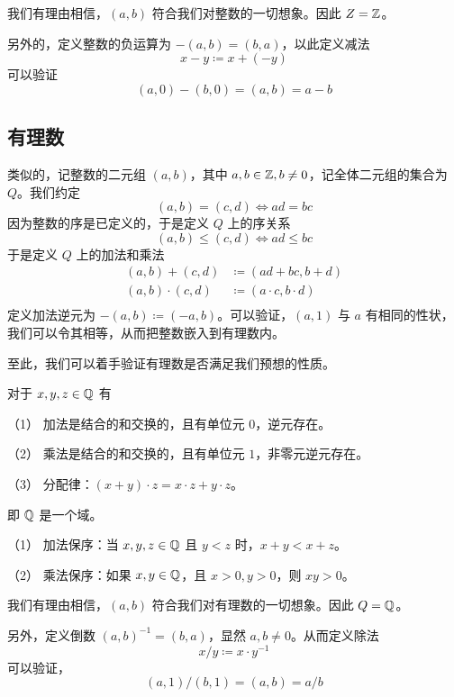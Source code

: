 我们有理由相信，$(a,b)$ 符合我们对整数的一切想象。因此 $Z = \mathbb{Z}$。

另外的，定义整数的负运算为 $-(a,b) = (b,a)$，以此定义减法
$$x - y \coloneqq  x + (-y)$$
可以验证
$$(a,0) - (b,0) = (a,b) = a - b$$

\subsection{有理数}

类似的，记整数的二元组 $(a,b)$，其中 $a,b\in \mathbb{Z},b\ne 0$，记全体二元组的集合为 $Q$。我们约定
$$(a,b) = (c,d) \Leftrightarrow ad = bc$$
因为整数的序是已定义的，于是定义 $Q$ 上的序关系
$$(a,b) \leqslant (c,d) \Leftrightarrow ad \leqslant bc$$
于是定义 $Q$ 上的加法和乘法
\begin{equation*}
	\begin{aligned}
		(a,b) + (c,d)     & \coloneqq  (ad+bc,b+d)           \\
		(a,b) \cdot (c,d) & \coloneqq  (a \cdot c,b \cdot d) \\
	\end{aligned}
\end{equation*}
定义加法逆元为 $-(a,b) \coloneqq  (-a,b)$。可以验证，$(a,1)$ 与 $a$ 有相同的性状，我们可以令其相等，从而把整数嵌入到有理数内。

至此，我们可以着手验证有理数是否满足我们预想的性质。

\begin{theorem}[$\QQ$ 的代数算律]
	对于 $x,y,z\in \mathbb{Q}$ 有

	（1） 加法是结合的和交换的，且有单位元 $0$，逆元存在。

	（2） 乘法是结合的和交换的，且有单位元 $1$，非零元逆元存在。

	（3） 分配律：$(x+y) \cdot  z = x \cdot z + y\cdot z$。
\end{theorem}

即 $\QQ$ 是一个域。

\begin{theorem}[$\QQ$ 是有序域]
	（1） 加法保序：当 $x,y,z\in \mathbb{Q}$ 且 $y<z$ 时，$x+y<x+z$。

	（2） 乘法保序：如果 $x,y\in \mathbb{Q}$，且 $x>0,y>0$，则 $xy>0$。
\end{theorem}

我们有理由相信，$(a,b)$ 符合我们对有理数的一切想象。因此 $Q = \mathbb{Q}$。

另外，定义倒数 $(a,b)^{-1} = (b,a)$，显然 $a,b\ne 0$。从而定义除法
$$x/y \coloneqq  x \cdot y^{-1}$$
可以验证，
$$(a,1)/(b,1) = (a,b) = a/b$$

